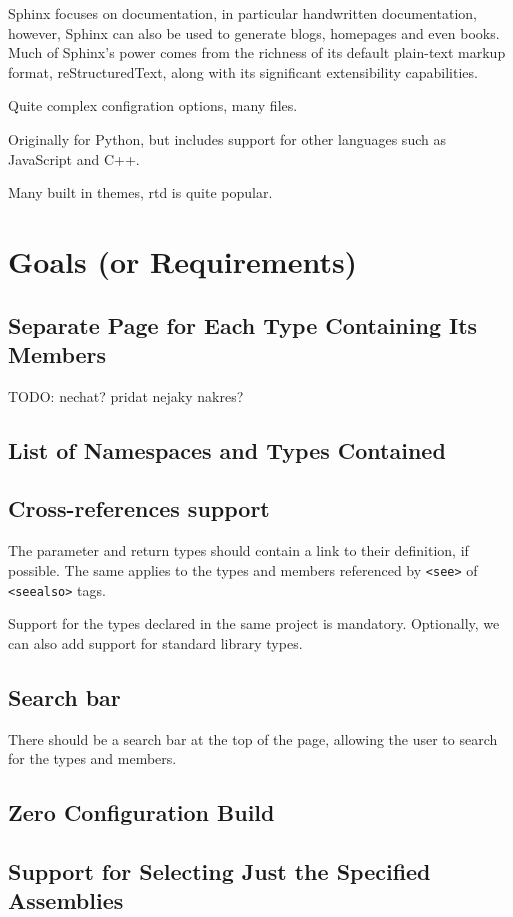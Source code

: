 Sphinx focuses on documentation, in particular handwritten documentation, however, Sphinx can also be used to generate blogs, homepages and even books. Much of Sphinx’s power comes from the richness of its default plain-text markup format, reStructuredText, along with its significant extensibility capabilities.

Quite complex configration options, many files.

Originally for Python, but includes support for other languages such as JavaScript and C++.

Many built in themes, rtd is quite popular.

\section{Goals (or Requirements)}

\subsection{Separate Page for Each Type Containing Its Members}
TODO: nechat? pridat nejaky nakres?
\subsection{List of Namespaces and Types Contained}
\subsection{Cross-references support}

The parameter and return types should contain a link to their definition, if possible.
The same applies to the types and members referenced by \texttt{<see>} of \texttt{<seealso>} tags.

Support for the types declared in the same project is mandatory.
Optionally, we can also add support for standard library types.

\subsection{Search bar}
There should be a search bar at the top of the page, allowing the user to search for the types and members.

\subsection{Zero Configuration Build}
\subsection{Support for Selecting Just the Specified Assemblies}

